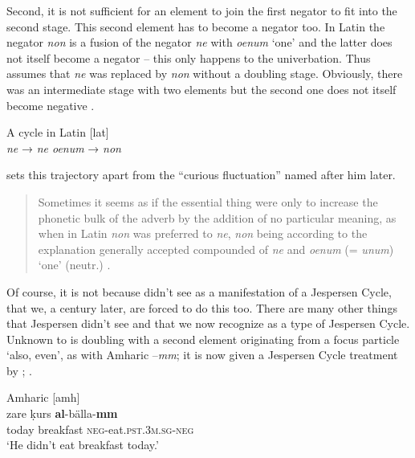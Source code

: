 ﻿\documentclass[output=paper,draft,draftmode,colorlinks,citecolor=brown]{langscibook}
\begin{document}
Second, it is not sufficient for an element to join the first negator to
fit into the second stage. This second element has to become a negator
too. In Latin the negator \textit{non} is a fusion of the negator
\textit{ne} with \textit{oenum} `one' and the latter does not itself
become a negator -- this only happens to the univerbation. Thus
\textcite[14--15]{Jespersen1917} assumes that \textit{ne} was replaced by
\textit{non} without a doubling stage. Obviously, there was an
intermediate stage with two elements but the second one does not itself
become negative .
%
\begin{exe}\ex\label{ex:int-a-cycle-in-latin}
          A cycle in Latin [lat]\\[1ex]
\textit{ne} \hspace{5mm}  →  \hspace{5mm}  \textit{ne oenum}  \hspace{5mm}  →  \hspace{5mm}  \textit{non}
    \end{exe}
%
\textcite{Jespersen1917} sets this trajectory apart from the ``curious fluctuation'' named after him later. 
%
\begin{quote}
Sometimes it seems as if the essential thing were only to increase the phonetic bulk of the adverb by the addition of no particular meaning, as when in Latin \textit{non} was preferred to \textit{ne}, \textit{non} being according to the explanation generally accepted compounded of \textit{ne} and \textit{oenum} (= \textit{unum}) `one' (neutr.) \citep[14--15]{Jespersen1917}.
\end{quote}
%
Of course, it is not because \textcite{Jespersen1917} didn't see
 as a manifestation of a Jespersen Cycle, that we, a century
later, are forced to do this too. There are many other things that
Jespersen didn't see and that we now recognize as a type of Jespersen
Cycle. Unknown to \textcite{Jespersen1917} is doubling with a second element
originating from a focus particle `also, even', as with Amharic
–\textit{mm}; it is now given a Jespersen Cycle treatment by
\textcite[305--306, 349--350]{Sjors2015};
\textcite[341--343, 388--389]{Sjors2018}
 \parencite[cp. also][69 on the Loyalty Islands languages Drehu
and Nengone]{MoyseFaurieOzanneRivierre1999}.
%
\begin{exe}\ex\label{ex:int-amharic-breakfast}
Amharic [amh] \\
    \gll zare  ḳurs    \textbf{al}-bälla-\textbf{mm} \\
  today  breakfast  \textsc{neg}-eat.\textsc{pst.3m.sg-neg}  \\
    \glt `He didn't eat breakfast today.'
    \end{exe}
\end{document}
